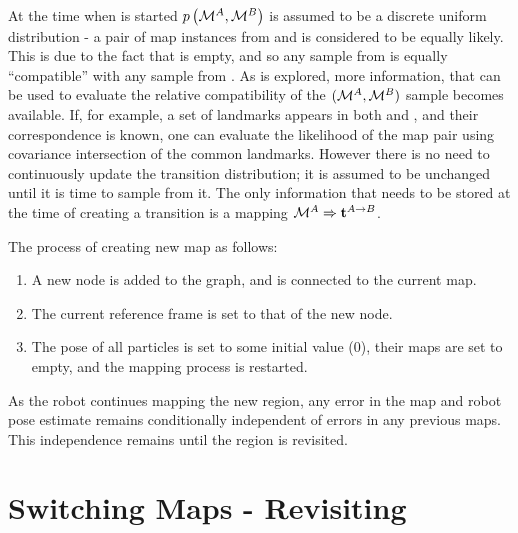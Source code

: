 At the time when \mapB is started $\prob{\mapA,\mapB}$ is assumed to
be a discrete uniform distribution - a pair of map instances from
\mapA and \mapB is considered to be equally likely. This is due to the
fact that \mapB is empty, and so any sample from \mapB is equally
``compatible'' with any sample from \mapA. As \mapB is explored, more
information, that can be used to evaluate the relative compatibility
of the $(\mapA,\mapB)$ sample becomes available. If, for example, a
set of landmarks appears in both \mapA and \mapB, and their
correspondence is known, one can evaluate the likelihood of the map
pair using covariance intersection \cite{cov_intersection} of the
common landmarks. However there is no need to continuously update the
transition distribution; it is assumed to be unchanged until it is
time to sample from it. The only information that needs to be stored
at the time of creating a transition is a mapping $\mapA \Rightarrow
\tr{}{A}{B}$.


The process of creating new map as follows:

\begin{enumerate}

\item A new node is added to the graph, and is connected to the
  current map.

\item The current reference frame is set to that of the new node.

\item The pose of all particles is set to some initial value (0),
  their maps are set to empty, and the mapping process is restarted.

\end{enumerate}

As the robot continues mapping the new region, any error in the map
and robot pose estimate remains conditionally independent of errors
in any previous maps. This independence remains until the region is
revisited.


\section{Switching Maps - Revisiting}
\label{sec:revisiting}

